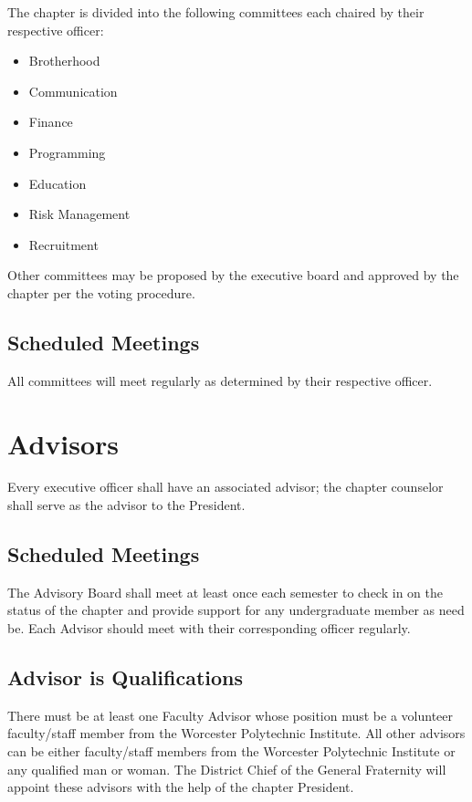 The chapter is divided into the following committees each chaired by their respective officer: 
\begin{itemize}
        \item Brotherhood
        \item Communication
        \item Finance
        \item Programming
        \item Education
        \item Risk Management
        \item Recruitment
\end{itemize}

Other committees may be proposed by the executive board and approved by the chapter per the voting procedure.

\subsection{Scheduled Meetings}

All committees will meet regularly as determined by their respective officer.

\section{Advisors}

Every executive officer shall have an associated advisor; the chapter counselor shall serve as the advisor to the President.

\subsection{Scheduled Meetings}

The Advisory Board shall meet at least once each semester to check in on the status of the chapter and provide support for any undergraduate member as need be.
Each Advisor should meet with their corresponding officer regularly.

\subsection{Advisor is Qualifications}

There must be at least one Faculty Advisor whose position must be a volunteer faculty/staff member from the Worcester Polytechnic Institute.
All other advisors can be either faculty/staff members from the Worcester Polytechnic Institute or any qualified man or woman.
The District Chief of the General Fraternity will appoint these advisors with the help of the chapter President.

